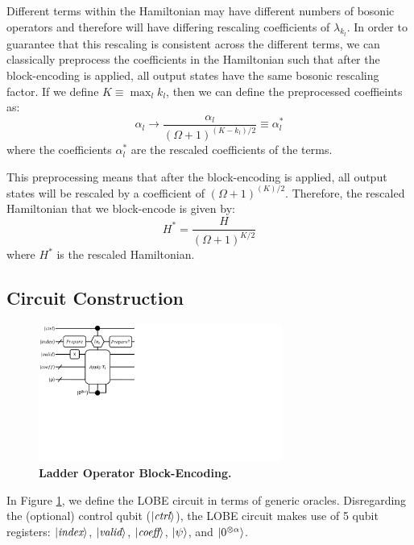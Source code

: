 Different terms within the Hamiltonian may have different numbers of bosonic operators and therefore will have differing rescaling coefficients of $\lambda_{k_l}$.
In order to guarantee that this rescaling is consistent across the different terms, we can classically preprocess the coefficients in the Hamiltonian such that after the block-encoding is applied, all output states have the same bosonic rescaling factor.
If we define $K \equiv \max_l{k_l}$, then we can define the preprocessed coeffieints as:
\begin{equation}
    \alpha_l \rightarrow \frac{\alpha_l}{(\Omega + 1)^{(K - k_l)/2}} \equiv \alpha_l^*
\end{equation}
where the coefficients $\alpha_l^*$ are the rescaled coefficients of the terms.

This preprocessing means that after the block-encoding is applied, all output states will be rescaled by a coefficient of $(\Omega + 1)^{(K)/2}$.
Therefore, the rescaled Hamiltonian that we block-encode is given by:
\begin{equation}
    H^* = \frac{H}{(\Omega + 1)^{K/2}}
\end{equation}
where $H^*$ is the rescaled Hamiltonian.

\subsection{Circuit Construction}
\label{subsec:circuit}

\begin{figure}
    \centering
    \includegraphics[width=8cm]{figures/lobe-block-encoding.pdf}
    \caption{\textbf{Ladder Operator Block-Encoding.}
    }
    \label{fig:lobe}
\end{figure}

In Figure \ref{fig:lobe}, we define the LOBE circuit in terms of generic oracles.
Disregarding the (optional) control qubit ($\ket{\textit{ctrl}}$), the LOBE circuit makes use of 5 qubit registers: $\ket{\textit{index}}$, $\ket{\textit{valid}}$, $\ket{\textit{coeff}}$, $\ket{\psi}$, and $\ket{0^{\otimes \alpha}}$.

